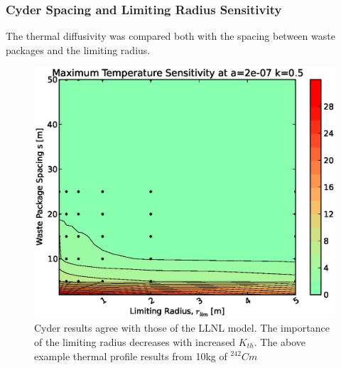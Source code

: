 \begin{frame}[ctb!]
\frametitle{Cyder Spacing and Limiting Radius Sensitivity}
\footnotesize{
The thermal diffusivity was compared both with the 
spacing between waste packages and the limiting radius. 

\begin{figure}[htbp!]
\begin{center}
\includegraphics[height=0.7\textheight]{./thermal_demonstration/spacing/rs.eps}
\end{center}
\caption[$\alpha_{th}$ vs. $r_{lim}$ Sensitivity in Cyder]
{Cyder results agree with 
those of the LLNL model. The importance of the limiting radius decreases with 
increased $K_{th}$. The above example thermal profile results from 10kg of 
$^{242}Cm$}
\label{fig:rs}
\end{figure}
}
\end{frame}
